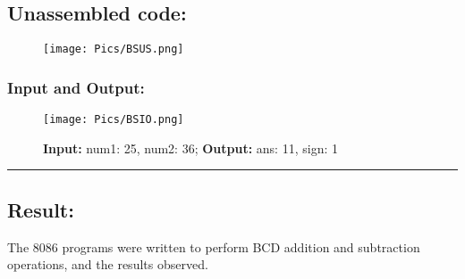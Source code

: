 \documentclass[10pt,a4paper]{article}
\begin{document}
\begin{flushleft}
\newpage
\subsection*{\textbf{Unassembled code:}}
\begin{figure}[h]
    \centering
    \texttt{[image: Pics/BSUS.png]}
\end{figure}
\subsubsection*{\textbf{Input and Output:}}
\begin{figure}[h]
    \centering
    \texttt{[image: Pics/BSIO.png]}
    \caption{ \textbf{Input:} num1: 25, num2: 36; \newline \hspace{1cm}
              \textbf{Output:} ans: 11, sign: 1}
\end{figure}
\hrule
\subsection*{\textbf{Result:}}
The 8086 programs were written to perform BCD addition and subtraction operations, and the results observed.
\end{flushleft}
\end{document}
